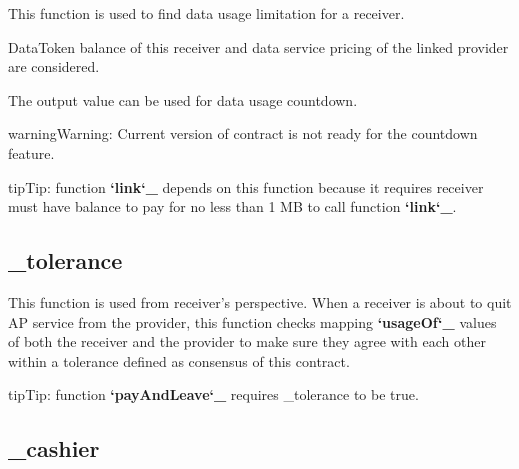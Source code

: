 \documentclass[letterpaper,10pt,english]{sphinxmanual}
\begin{document}
This function is used to find data usage limitation for a receiver.

DataToken balance of this receiver and data service pricing of the linked provider are considered.

The output value can be used for data usage countdown.

\begin{sphinxadmonition}{warning}{Warning:}
Current version of contract is not ready for the countdown feature.
\end{sphinxadmonition}

\begin{sphinxadmonition}{tip}{Tip:}
function {\color{red}\bfseries{}{}`link{}`\_} depends on this function because it requires receiver must have balance to pay for no less than 1 MB to call function {\color{red}\bfseries{}{}`link{}`\_}.
\end{sphinxadmonition}


\subsection{\_tolerance}
\label{\detokenize{InternalFunctions:tolerance}}
%
\begin{sphinxVerbatim}[commandchars=\\\{\}]
     
\end{sphinxVerbatim}

This function is used from receiver’s perspective. When a receiver is about to quit AP service from the provider,
this function checks mapping {\color{red}\bfseries{}{}`usageOf{}`\_} values of both the receiver and the provider to make sure they agree with each other within a tolerance defined as consensus of this contract.

\begin{sphinxadmonition}{tip}{Tip:}
function {\color{red}\bfseries{}{}`payAndLeave{}`\_} requires \_tolerance to be true.
\end{sphinxadmonition}


\subsection{\_cashier}
\label{\detokenize{InternalFunctions:cashier}}
%
\begin{sphinxVerbatim}[commandchars=\\\{\}]
     
\end{sphinxVerbatim}
\end{document}
